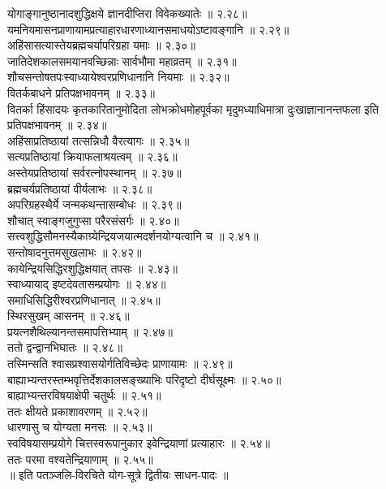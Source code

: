 \begin{multicols}{2}
\begin{flushleft}
योगाङ्गानुष्ठानादशुद्धिक्षये ज्ञानदीप्तिरा विवेकख्यातेः ॥ २.२८॥\\
यमनियमासनप्राणायामप्रत्याहारधारणाध्यानसमाधयोऽष्टावङ्गानि ॥ २.२९॥\\
अहिंसासत्यास्तेयब्रह्मचर्यापरिग्रहा यमाः ॥ २.३०॥\\
जातिदेशकालसमयानवच्छिन्नाः सार्वभौमा महाव्रतम् ॥ २.३१॥\\
शौचसन्तोषतपःस्वाध्यायेश्वरप्रणिधानानि नियमाः ॥ २.३२॥\\
वितर्कबाधने प्रतिपक्षभावनम् ॥ २.३३॥\\
वितर्का हिंसादयः कृतकारितानुमोदिता लोभक्रोधमोहपूर्वका मृदुमध्याधिमात्रा दुःखाज्ञानानन्तफला इति प्रतिपक्षभावनम् ॥ २.३४॥\\
अहिंसाप्रतिष्ठायां तत्सन्निधौ वैरत्यागः ॥ २.३५॥\\
सत्यप्रतिष्ठायां क्रियाफलाश्रयत्वम् ॥ २.३६॥\\
अस्तेयप्रतिष्ठायां सर्वरत्नोपस्थानम् ॥ २.३७॥\\
ब्रह्मचर्यप्रतिष्ठायां वीर्यलाभः ॥ २.३८॥\\
अपरिग्रहस्थैर्ये जन्मकथन्तासम्बोधः ॥ २.३९॥\\
शौचात् स्वाङ्गजुगुप्सा परैरसंसर्गः ॥ २.४०॥\\
सत्त्वशुद्धिसौमनस्यैकाग्र्येन्द्रियजयात्मदर्शनयोग्यत्वानि च ॥ २.४१॥\\
सन्तोषादनुत्तमसुखलाभः ॥ २.४२॥\\
कायेन्द्रियसिद्धिरशुद्धिक्षयात् तपसः ॥ २.४३॥\\
स्वाध्यायाद् इष्टदेवतासम्प्रयोगः ॥ २.४४॥\\
समाधिसिद्धिरीश्वरप्रणिधानात् ॥ २.४५॥\\
स्थिरसुखम् आसनम् ॥ २.४६॥\\
प्रयत्नशैथिल्यानन्तसमापत्तिभ्याम् ॥ २.४७॥\\
ततो द्वन्द्वानभिघातः ॥ २.४८॥\\
तस्मिन्सति श्वासप्रश्वासयोर्गतिविच्छेदः प्राणायामः ॥ २.४९॥\\
बाह्याभ्यन्तरस्तम्भवृत्तिर्देशकालसङ्ख्याभिः परिदृष्टो दीर्घसूक्ष्मः ॥ २.५०॥\\
बाह्याभ्यन्तरविषयाक्षेपी चतुर्थः ॥ २.५१॥\\
ततः क्षीयते प्रकाशावरणम् ॥ २.५२॥\\
धारणासु च योग्यता मनसः ॥ २.५३॥\\
स्वविषयासम्प्रयोगे चित्तस्वरूपानुकार इवेन्द्रियाणां प्रत्याहारः ॥ २.५४॥\\
ततः परमा वश्यतेन्द्रियाणाम् ॥ २.५५॥\\
॥ इति पतञ्जलि-विरचिते योग-सूत्रे द्वितीयः साधन-पादः ॥\\
\end{flushleft}


\end{multicols}
